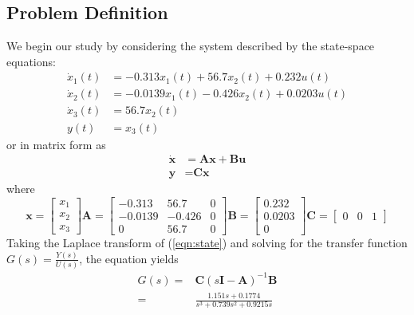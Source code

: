 \documentclass{article}
\begin{document}
    \subsection{Problem Definition}
    We begin our study by considering the system described by the state-space equations:
    \begin{equation}
        \begin{aligned}
            \dot{x}_1(t)&=-0.313x_1(t)+56.7x_2(t)+0.232u(t)\\
            \dot{x}_2(t)&=-0.0139x_1(t)-0.426x_2(t)+0.0203u(t)\\
            \dot{x}_3(t)&=56.7x_2(t)\\
            y(t)&=x_3(t)
        \end{aligned}
    \end{equation}
    or in matrix form as
    \begin{equation}
        \begin{aligned}
            \dot{\textbf{x}}&=\textbf{Ax}+\textbf{Bu}\\
            \textbf{y}&=\textbf{Cx}
        \end{aligned}
    \label{eqn:state}
    \end{equation}
    where
    \begin{equation}
        \nonumber
        \textbf{x}=
        \begin{bmatrix}
            x_1\\
            x_2\\
            x_3
        \end{bmatrix}
        \textbf{A}=
        \begin{bmatrix}
            -0.313 &56.7& 0\\
            -0.0139& -0.426& 0\\
            0 &56.7& 0
        \end{bmatrix}
        \textbf{B}=
        \begin{bmatrix}
            0.232\\
            0.0203\\
            0
        \end{bmatrix}
        \textbf{C}=
        \begin{bmatrix}
            0&0&1
        \end{bmatrix}
    \end{equation}
    Taking the Laplace transform of (\ref{eqn:state}) and solving for the transfer function \(G(s)=\frac{Y(s)}{U(s)}\), the equation yields
    \begin{equation}
        \begin{aligned}
            G(s)=&\textbf{C}(s\textbf{I}-\textbf{A})^{-1}\textbf{B}\\
            =&\frac{1.151s+0.1774}{s^3+0.739s^2+0.9215s}
        \end{aligned}
    \end{equation}
\end{document}
